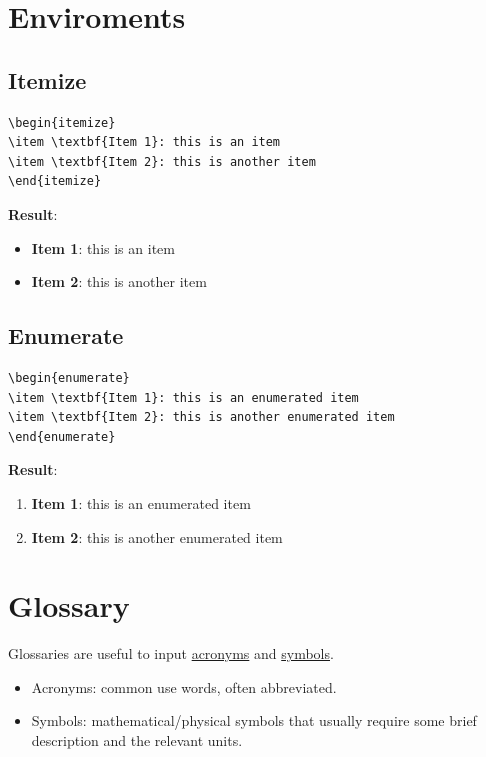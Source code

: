 \documentclass[11pt]{article}
\begin{document}
\section{Enviroments}
\label{sec:org4102c27}
\subsection{Itemize}
\label{sec:org574551c}
\lstset{language=[LaTeX]TeX,label= ,caption= ,captionpos=b,numbers=none}
\begin{lstlisting}
\begin{itemize}
\item \textbf{Item 1}: this is an item
\item \textbf{Item 2}: this is another item
\end{itemize}
\end{lstlisting}
\textbf{Result}:
\begin{itemize}
\item \textbf{Item 1}: this is an item
\item \textbf{Item 2}: this is another item
\end{itemize}

\subsection{Enumerate}
\label{sec:org9d11cf3}
\lstset{language=[LaTeX]TeX,label= ,caption= ,captionpos=b,numbers=none}
\begin{lstlisting}
\begin{enumerate}
\item \textbf{Item 1}: this is an enumerated item
\item \textbf{Item 2}: this is another enumerated item
\end{enumerate}
\end{lstlisting}
\textbf{Result}:
\begin{enumerate}
\item \textbf{Item 1}: this is an enumerated item
\item \textbf{Item 2}: this is another enumerated item
\end{enumerate}
\section{Glossary}
\label{sec:org8845f59}
Glossaries are useful to input \uline{acronyms} and \uline{symbols}.
\begin{itemize}
\item Acronyms: common use words, often abbreviated.
\item Symbols: mathematical/physical symbols that usually require some brief
description and the relevant units.
\end{itemize}
\end{document}
